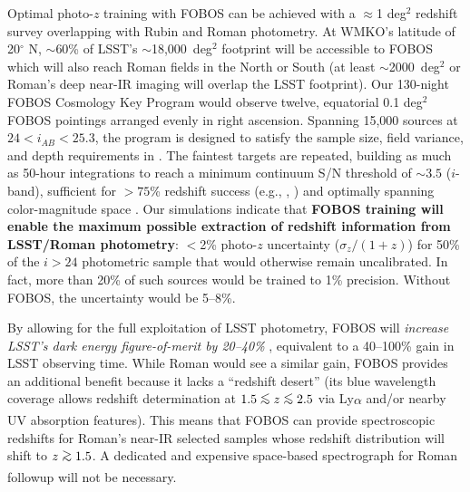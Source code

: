 \documentclass[oneside,11pt]{amsart}
\DeclareRobustCommand{\gtrsim}{%
\mathrel{\hskip-.5em\begin{array}{c}>\\[-8pt]\sim\end{array}\hskip-.5em}}
\DeclareRobustCommand{\lesssim}{%
\mathrel{\hskip-.5em\begin{array}{c}<\\[-8pt]\sim\end{array}\hskip-.5em}}
\begin{document}
Optimal photo-$z$ training with FOBOS can be achieved with a $\approx$1 deg$^2$ redshift survey overlapping with Rubin and Roman photometry.  At WMKO's latitude of 20$^\circ$ N, $\sim$60\% of LSST's $\sim$18,000~deg$^{2}$ footprint will be accessible to FOBOS which will also reach Roman fields in the North or South (at least $\sim$2000~deg$^{2}$ or Roman's deep near-IR imaging will overlap the LSST footprint).  Our 130-night FOBOS Cosmology Key Program would observe twelve, equatorial 0.1 deg$^2$ FOBOS pointings arranged evenly in right ascension.  Spanning 15,000 sources at $24 < i_{AB} < 25.3$, the program is designed to satisfy the sample size, field variance, and depth requirements in \citet{newman15}.  The faintest targets are repeated, building as much as 50-hour integrations to reach a minimum continuum S/N threshold of $\sim3.5$ ($i$-band), sufficient for $>75$\% redshift success (e.g., \citealp{Newman13}, \citealp{masters19}) and optimally spanning color-magnitude space \citep{masters15, masters19}.  Our simulations indicate that \textbf{FOBOS training will enable the maximum possible extraction of redshift information from LSST/Roman photometry}: $<$2\% photo-$z$ uncertainty ($\sigma_z / (1+z)$) for 50\% of the $i > 24$ photometric sample that would otherwise remain uncalibrated.  In fact, more than 20\% of such sources would be trained to 1\% precision.  Without FOBOS, the uncertainty would be 5--8\%.  





By allowing for the full exploitation of LSST photometry, FOBOS will \emph{increase LSST's dark energy figure-of-merit by 20--40\%} \citep{newman15}, equivalent to a 40--100\% gain in LSST observing time.  While Roman would see a similar gain, FOBOS provides an additional benefit because it lacks a ``redshift desert'' (its blue wavelength coverage allows redshift determination at $1.5\lesssim z \lesssim2.5$ via Ly$\alpha$ and/or nearby UV absorption features).  This means that FOBOS can provide spectroscopic redshifts for Roman's near-IR selected samples whose redshift distribution will shift to $z \gtrsim 1.5$.  A dedicated and expensive space-based spectrograph for Roman followup will not be necessary.
\end{document}
